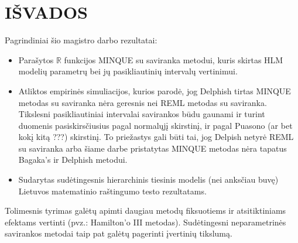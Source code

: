 \documentclass[12pt,a4paper]{article}
\newcommand{\R}{{\mathbb R}}
\begin{document}
\section{IŠVADOS}
\indent Pagrindiniai šio magistro darbo rezultatai:
\begin{itemize}
\item Parašytos $\R$ funkcijos MINQUE su saviranka metodui, kuris skirtas HLM modelių parametrų bei jų pasikliautinių intervalų vertinimui.
\item Atliktos empirinės simuliacijos, kurios parodė, jog Delphish tirtas MINQUE metodas su saviranka nėra geresnis nei REML metodas su saviranka. Tikslesni pasikliautiniai intervalai savirankos būdu gaunami ir turint duomenis pasiskirsčiusius pagal normalųjį skirstinį, ir pagal Puasono (ar bet kokį kitą ???) skirstinį. To priežastys gali būti tai, jog Delpish netyrė REML su saviranka arba šiame darbe pristatytas MINQUE metodas nėra tapatus Bagaka's ir Delphish metodui.

\item Sudarytas sudėtingesnis hierarchinis tiesinis modelis (nei anksčiau buvę) Lietuvos matematinio raštingumo testo rezultatams.
\end{itemize}

\indent Tolimesnis tyrimas galėtų apimti daugiau metodų fiksuotiems ir atsitiktiniams efektams vertinti (pvz.: Hamilton'o III metodas). Sudėtingesni neparametrinės savirankos metodai taip pat galėtų pagerinti įvertinių tikslumą.


\newpage
\end{document}
